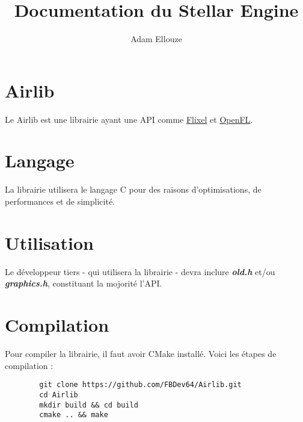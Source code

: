 \documentclass{article}
\title{Documentation du Stellar Engine}
\author{Adam Ellouze}
\numberwithin{equation}{section}    %
\begin{document}

\maketitle

\section{Airlib}
    Le Airlib est une librairie ayant une API comme \href{httŝ://flixel.org}{Flixel} et \href{https://www.openfl.org/}{OpenFL}.\vspace{1cm}

\section{Langage}
La librairie utilisera le langage C pour des raisons d'optimisations, de performances et de simplicité.

\section{Utilisation}
    Le développeur tiers - qui utilisera la librairie - devra inclure \textit{\textbf{old.h}}  et/ou \textit{\textbf{graphics.h}}, constituant la mojorité l'API.

\section{Compilation}
    Pour compiler la librairie, il faut avoir CMake installé. Voici les étapes de compilation : \vspace{0.5cm}

    \begin{lstlisting}
        git clone https://github.com/FBDev64/Airlib.git
        cd Airlib
        mkdir build && cd build
        cmake .. && make
    \end{lstlisting}
    \vspace{0.5cm}
\end{document}
